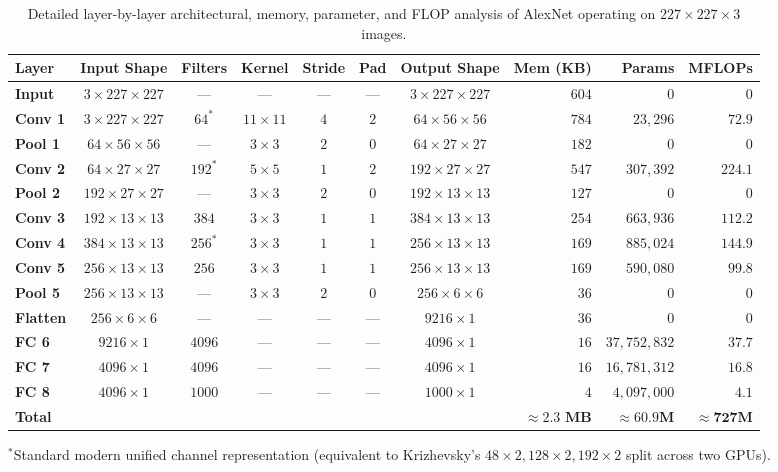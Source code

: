 \begin{table}[H]
\centering
\small
\setlength{\tabcolsep}{4.5pt}
\caption{Detailed layer-by-layer architectural, memory, parameter, and FLOP analysis of AlexNet operating on $227 \times 227 \times 3$ images.}
\label{tab:alexnet_layer_breakdown}
\vspace{4pt}
\begin{tabularx}{\textwidth}{l c c c c c c r r r}
\toprule
\textbf{Layer} & \textbf{Input Shape} & \textbf{Filters} & \textbf{Kernel} & \textbf{Stride} & \textbf{Pad} & \textbf{Output Shape} & \textbf{Mem (KB)} & \textbf{Params} & \textbf{MFLOPs} \\
\midrule
\textbf{Input} & $3 \times 227 \times 227$ & --- & --- & --- & --- & $3 \times 227 \times 227$ & $604$ & $0$ & $0$ \\
\textbf{Conv 1} & $3 \times 227 \times 227$ & $64^*$ & $11 \times 11$ & $4$ & $2$ & $64 \times 56 \times 56$ & $784$ & $23,296$ & $72.9$ \\
\textbf{Pool 1} & $64 \times 56 \times 56$ & --- & $3 \times 3$ & $2$ & $0$ & $64 \times 27 \times 27$ & $182$ & $0$ & $0$ \\
\textbf{Conv 2} & $64 \times 27 \times 27$ & $192^*$ & $5 \times 5$ & $1$ & $2$ & $192 \times 27 \times 27$ & $547$ & $307,392$ & $224.1$ \\
\textbf{Pool 2} & $192 \times 27 \times 27$ & --- & $3 \times 3$ & $2$ & $0$ & $192 \times 13 \times 13$ & $127$ & $0$ & $0$ \\
\textbf{Conv 3} & $192 \times 13 \times 13$ & $384$ & $3 \times 3$ & $1$ & $1$ & $384 \times 13 \times 13$ & $254$ & $663,936$ & $112.2$ \\
\textbf{Conv 4} & $384 \times 13 \times 13$ & $256^*$ & $3 \times 3$ & $1$ & $1$ & $256 \times 13 \times 13$ & $169$ & $885,024$ & $144.9$ \\
\textbf{Conv 5} & $256 \times 13 \times 13$ & $256$ & $3 \times 3$ & $1$ & $1$ & $256 \times 13 \times 13$ & $169$ & $590,080$ & $99.8$ \\
\textbf{Pool 5} & $256 \times 13 \times 13$ & --- & $3 \times 3$ & $2$ & $0$ & $256 \times 6 \times 6$ & $36$ & $0$ & $0$ \\
\textbf{Flatten}& $256 \times 6 \times 6$ & --- & --- & --- & --- & $9216 \times 1$ & $36$ & $0$ & $0$ \\
\textbf{FC 6}   & $9216 \times 1$ & $4096$ & --- & --- & --- & $4096 \times 1$ & $16$ & $37,752,832$ & $37.7$ \\
\textbf{FC 7}   & $4096 \times 1$ & $4096$ & --- & --- & --- & $4096 \times 1$ & $16$ & $16,781,312$ & $16.8$ \\
\textbf{FC 8}   & $4096 \times 1$ & $1000$ & --- & --- & --- & $1000 \times 1$ & $4$ & $4,097,000$ & $4.1$ \\
\midrule
\textbf{Total}  & & & & & & & $\approx \mathbf{2.3\text{ MB}}$ & $\approx \mathbf{60.9\text{M}}$ & $\approx \mathbf{727\text{M}}$ \\
\bottomrule
\end{tabularx}
\vspace{2pt}
{\scriptsize $^*$Standard modern unified channel representation (equivalent to Krizhevsky's $48 \times 2, 128 \times 2, 192 \times 2$ split across two GPUs).}
\end{table}

